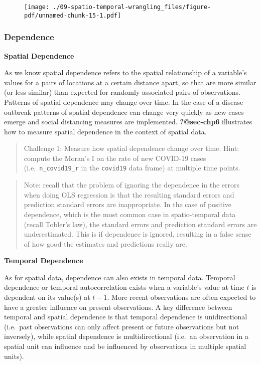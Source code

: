 \documentclass[
  letterpaper,
  krantz2]{style/krantz}
\begin{document}
\begin{figure}[H]

{\centering \texttt{[image: ./09-spatio-temporal-wrangling\_files/figure-pdf/unnamed-chunk-15-1.pdf]}

}

\end{figure}

\hypertarget{dependence}{%
\subsubsection{Dependence}\label{dependence}}

\textbf{Spatial Dependence}

As we know spatial dependence refers to the spatial relationship of a
variable's values for a pairs of locations at a certain distance apart,
so that are more similar (or less similar) than expected for randomly
associated pairs of observations. Patterns of spatial dependence may
change over time. In the case of a disease outbreak patterns of spatial
dependence can change very quickly as new cases emerge and social
distancing measures are implemented. \textbf{?@sec-chp6} illustrates how
to measure spatial dependence in the context of spatial data.

\begin{quote}
Challenge 1: Measure how spatial dependence change over time. Hint:
compute the Moran's I on the rate of new COVID-19 cases
(i.e.~\texttt{n\_covid19\_r} in the \texttt{covid19} data frame) at
multiple time points.
\end{quote}

\begin{quote}
Note: recall that the problem of ignoring the dependence in the errors
when doing OLS regression is that the resulting standard errors and
prediction standard errors are inappropriate. In the case of positive
dependence, which is the most common case in spatio-temporal data
(recall Tobler's law), the standard errors and prediction standard
errors are underestimated. This is if dependence is ignored, resulting
in a false sense of how good the estimates and predictions really are.
\end{quote}

\textbf{Temporal Dependence}

As for spatial data, dependence can also exists in temporal data.
Temporal dependence or temporal autocorrelation exists when a variable's
value at time \(t\) is dependent on its value(s) at \(t-1\). More recent
observations are often expected to have a greater influence on present
observations. A key difference between temporal and spatial dependence
is that temporal dependence is unidirectional (i.e.~past observations
can only affect present or future observations but not inversely), while
spatial dependence is multidirectional (i.e.~an observation in a spatial
unit can influence and be influenced by observations in multiple spatial
units).
\end{document}
